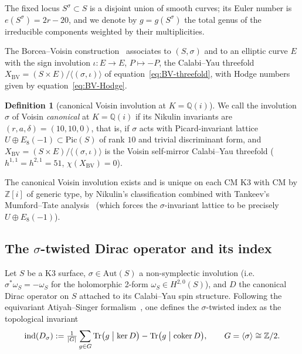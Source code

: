 \documentclass[11pt,a4paper]{article}
\theoremstyle{plain}
\theoremstyle{definition}
\newtheorem{definition}[theorem]{Definition}
\newcommand{\Q}{\mathbb{Q}}
\newcommand{\Z}{\mathbb{Z}}
\newcommand{\Tr}{\mathrm{Tr}}
\newcommand{\ind}{\mathrm{ind}}
\newcommand{\Pic}{\mathrm{Pic}}
\newcommand{\Aut}{\mathrm{Aut}}
\begin{document}
The fixed locus $S^{\sigma}\subset S$ is a disjoint union of smooth
curves; its Euler number is $e(S^{\sigma})=2r-20$, and we denote by
$g=g(S^{\sigma})$ the total genus of the irreducible components weighted
by their multiplicities.

The Borcea--Voisin construction~\cite{Voisin1993,Borcea1997} associates
to $(S,\sigma)$ and to an elliptic curve $E$ with the sign involution
$\iota:E\to E$, $P\mapsto -P$, the Calabi--Yau threefold
$X_{\mathrm{BV}}=(S\times E)/\langle(\sigma,\iota)\rangle$ of
equation~\eqref{eq:BV-threefold}, with Hodge numbers given by
equation~\eqref{eq:BV-Hodge}.

\begin{definition}[canonical Voisin involution at $K=\Q(i)$]
\label{def:canonical-voisin}
We call the involution $\sigma$ of Voisin \emph{canonical} at $K=\Q(i)$
if its Nikulin invariants are $(r,a,\delta)=(10,10,0)$, that is, if
$\sigma$ acts with Picard-invariant lattice
$U\oplus E_{8}(-1)\subset\Pic(S)$ of rank $10$ and trivial discriminant
form, and $X_{\mathrm{BV}}=(S\times E)/\langle(\sigma,\iota)\rangle$ is
the Voisin self-mirror Calabi--Yau threefold ($h^{1,1}=h^{2,1}=51$,
$\chi(X_{\mathrm{BV}})=0$).
\end{definition}

The canonical Voisin involution exists and is unique on each CM K3 with CM
by $\Z[i]$ of generic type, by Nikulin's classification combined with
Tankeev's Mumford--Tate analysis~\cite{Tankeev1982} (which forces the
$\sigma$-invariant lattice to be precisely $U\oplus E_{8}(-1)$).

\subsection{The $\sigma$-twisted Dirac operator and its index}

Let $S$ be a K3 surface, $\sigma\in\Aut(S)$ a non-symplectic involution
(i.e.\ $\sigma^{*}\omega_{S}=-\omega_{S}$ for the holomorphic 2-form
$\omega_{S}\in H^{2,0}(S)$), and $D$ the canonical Dirac operator on $S$
attached to its Calabi--Yau spin structure. Following the equivariant
Atiyah--Singer formalism~\cite{AtiyahSinger1968III,LawsonMichelsohn1989},
one defines the $\sigma$-twisted index as the topological invariant
\begin{equation}
\label{eq:dirac-def}
   \ind(D_{\sigma}) := \tfrac{1}{|G|}\sum_{g\in G}\Tr\bigl(g\bigm|\ker D\bigr)
                      - \Tr\bigl(g\bigm|\mathrm{coker}\,D\bigr),
   \qquad G=\langle\sigma\rangle\cong\Z/2.
\end{equation}
\end{document}
